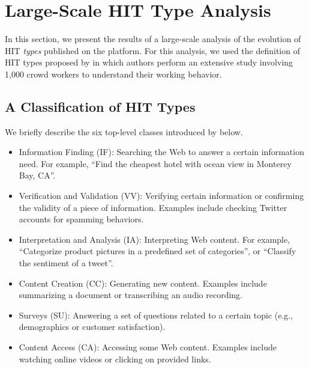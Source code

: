 \section{Large-Scale HIT Type Analysis}\label{sec:type}
In this section, we present the results of a large-scale analysis of the evolution of HIT \emph{types} published on the \amt{} platform.
For this analysis, we used the definition of HIT types proposed by \cite{Gadiraju:2014:TMW:2631775.2631819} in which authors perform an extensive study involving 1,000 crowd workers to understand their working behavior. 

\subsection{A Classification of HIT Types}
We briefly describe the six top-level classes introduced by \cite{Gadiraju:2014:TMW:2631775.2631819} below.

\begin{itemize}[noitemsep,topsep=0pt,parsep=0pt,partopsep=0pt]

	\item Information Finding (IF): Searching the Web to answer a certain information need. For example, ``Find the cheapest hotel with ocean view in Monterey Bay, CA''.
	
	\item Verification and Validation (VV): Verifying certain information or confirming the validity of a piece of information. Examples include checking Twitter accounts for spamming behaviors.

	\item Interpretation and Analysis (IA): Interpreting Web content. For example, ``Categorize product pictures in a predefined set of categories'', or ``Classify the sentiment of a tweet''.
	
	\item Content Creation (CC): Generating new content. Examples include summarizing a document  or transcribing an audio recording.

	\item Surveys (SU): Answering a set of questions related to a certain topic (e.g., demographics or customer satisfaction). 
	
	\item Content Access (CA): Accessing some Web content. Examples include watching online videos or clicking on provided links.

\end{itemize}

